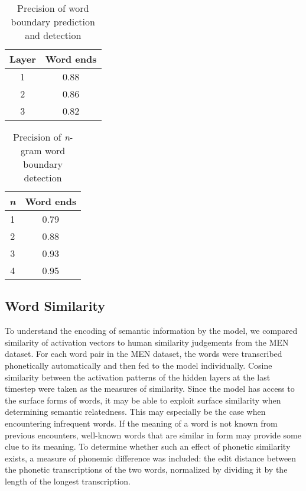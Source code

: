 \begin{table}[]
	\centering
	\caption{Precision of word boundary prediction and detection}
	\begin{tabular}{cc}
		Layer & Word ends \\
			\hline
		1 & 0.88 \\
		2 & 0.86 \\
		3 & 0.82
	\end{tabular}
\end{table}

\begin{table}[]
	\centering
	\caption{Precision of \textit{n}-gram word boundary detection}
	\begin{tabular}{cc}
		\textit{n} & Word ends \\
		\hline
		1 & 0.79 \\
		2 & 0.88 \\
		3 & 0.93 \\
		4 & 0.95
	\end{tabular}
\end{table}

\subsection{Word Similarity} %
To understand the encoding of semantic information by the model, we compared similarity of activation vectors to human similarity judgements from the MEN dataset. %
For each word pair in the MEN dataset, the words were transcribed phonetically automatically and then fed to the model individually. Cosine similarity between the activation patterns of the hidden layers at the last timestep were taken as the measures of similarity. %
Since the model has access to the surface forms of words, it may be able to exploit surface similarity when determining semantic relatedness. This may especially be the case when encountering infrequent words. If the meaning of a word is not known from previous encounters, well-known words that are similar in form may provide some clue to its meaning. To determine whether such an effect of phonetic similarity exists, a measure of phonemic difference was included: the edit distance between the phonetic transcriptions of the two words, normalized by dividing it by the length of the longest transcription.

